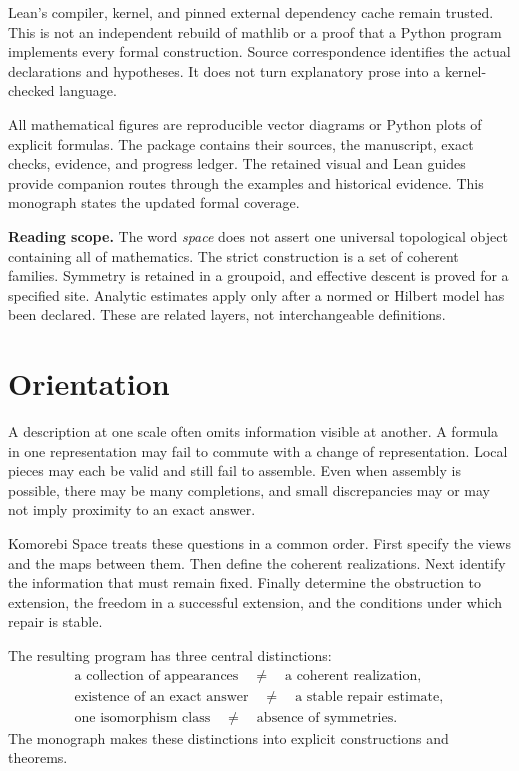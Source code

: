 \documentclass[11pt]{article}
\begin{document}
Lean's compiler, kernel, and pinned external dependency cache remain trusted. This is not an independent rebuild of mathlib or a proof that a Python program implements every formal construction. Source correspondence identifies the actual declarations and hypotheses. It does not turn explanatory prose into a kernel-checked language.

All mathematical figures are reproducible vector diagrams or Python plots of explicit formulas. The package contains their sources, the manuscript, exact checks, evidence, and progress ledger. The retained visual and Lean guides provide companion routes through the examples and historical evidence. This monograph states the updated formal coverage.

\begin{scopebox}
\textbf{Reading scope.} The word \emph{space} does not assert one universal topological object containing all of mathematics. The strict construction is a set of coherent families. Symmetry is retained in a groupoid, and effective descent is proved for a specified site. Analytic estimates apply only after a normed or Hilbert model has been declared. These are related layers, not interchangeable definitions.
\end{scopebox}

\clearpage
\section*{Orientation}
A description at one scale often omits information visible at another. A formula in one representation may fail to commute with a change of representation. Local pieces may each be valid and still fail to assemble. Even when assembly is possible, there may be many completions, and small discrepancies may or may not imply proximity to an exact answer.

Komorebi Space treats these questions in a common order. First specify the views and the maps between them. Then define the coherent realizations. Next identify the information that must remain fixed. Finally determine the obstruction to extension, the freedom in a successful extension, and the conditions under which repair is stable.

The resulting program has three central distinctions:
\[
\begin{gathered}
\text{a collection of appearances}\quad\ne\quad\text{a coherent realization},\\
\text{existence of an exact answer}\quad\ne\quad\text{a stable repair estimate},\\
\text{one isomorphism class}\quad\ne\quad\text{absence of symmetries}.
\end{gathered}
\]
The monograph makes these distinctions into explicit constructions and theorems.
\end{document}
